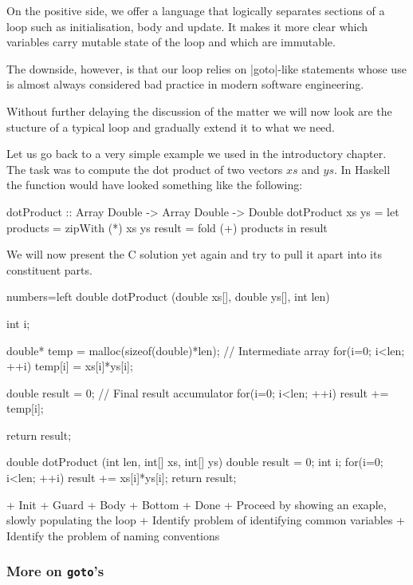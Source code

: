 On the positive side, we offer a language that logically separates sections of a loop such as initialisation, body and update. It makes it more clear which variables carry mutable state of the loop and which are immutable.

The downside, however, is that our loop relies on |goto|-like statements whose use is almost always considered bad practice in modern software engineering.

Without further delaying the discussion of the matter we will now look are the stucture of a typical loop and gradually extend it to what we need.

Let us go back to a very simple example we used in the introductory chapter. The task was to compute the dot product of two vectors $xs$ and $ys$. In Haskell the function would have looked something like the following:

\begin{hscode}
  dotProduct :: Array Double -> Array Double -> Double
  dotProduct xs ys
    = let products = zipWith (*) xs ys
          result   = fold (+) products
      in  result
\end{hscode}

We will now present the C solution yet again and try to pull it apart into its constituent parts.

\begin{ccode}{numbers=left}
double dotProduct (double xs[], double ys[], int len) {
  int i;

  double* temp = malloc(sizeof(double)*len);  // Intermediate array
  for(i=0; i<len; ++i)
    temp[i] = xs[i]*ys[i];

  double result = 0;                          // Final result accumulator
  for(i=0; i<len; ++i)
    result += temp[i];

  return result;
}
\end{ccode}

\begin{ccode}{}
double dotProduct (int len, int[] xs, int[] ys) {
  double result = 0;
  int i;
  for(i=0; i<len; ++i)
    result += xs[i]*ys[i];
  return result;
}

\end{ccode}


+ Init
+ Guard
+ Body
+ Bottom
+ Done
+ Proceed by showing an exaple, slowly populating the loop
+ Identify problem of identifying common variables
+ Identify the problem of naming conventions

\subsubsection{More on \texttt{goto}'s}

